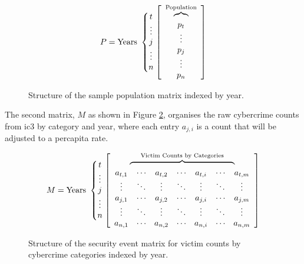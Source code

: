 \begin{figure}[H]
  \centering

\[
P=
\text{Years }\left\{
\begin{matrix}
t\\ \vdots\\ j\\ \vdots\\ n
\end{matrix}
\right.
\left[
\begin{array}{c}
\multicolumn{1}{c}{%
  \overbrace{\hphantom{p_{t}}}^{\text{Population}}%
}\\
p_t \\
\vdots \\
p_j \\
\vdots \\
p_n
\end{array}
\right]
\]

  \caption{Structure of the  \gls{sample}  \gls{population} \gls{matrix} indexed by year.}
  \label{fig:statcalc-popmatrix}
\end{figure}

The second \gls{matrix}, $M$ as shown in Figure \ref{fig:statevent-victimcount}, organises the raw  \gls{cybercrime} counts from \gls{ic3} by category and year, where each entry $a_{j,i}$ is a count that will be adjusted to a \gls{percapita} rate.


\begin{figure}[H]
  \centering
\[
M=
\text{Years }\left\{
\begin{matrix}
t\\ \vdots\\ j\\ \vdots\\ n
\end{matrix}
\right.
\left[
\begin{array}{ccccccc}
\multicolumn{7}{c}{%
  \overbrace{%
    \hphantom{a_{t,1}\ \cdots\ a_{t,2}\ \cdots\ a_{t,i}\ \cdots\ a_{t,m}}%
  }^{\text{Victim Counts by Categories}}%
}\\
a_{t,1} & \cdots & a_{t,2} & \cdots & a_{t,i} & \cdots & a_{t,m} \\
\vdots  & \ddots & \vdots  & \ddots & \vdots  & \ddots & \vdots \\
a_{j,1} & \cdots & a_{j,2} & \cdots & a_{j,i} & \cdots & a_{j,m} \\
\vdots  & \ddots & \vdots  & \ddots & \vdots  & \ddots & \vdots \\
a_{n,1} & \cdots & a_{n,2} & \cdots & a_{n,i} & \cdots & a_{n,m}
\end{array}
\right]
\]

  \caption{Structure of the security event \gls{matrix} for victim counts by  \gls{cybercrime} categories indexed by year.}
  \label{fig:statevent-victimcount}
\end{figure}


